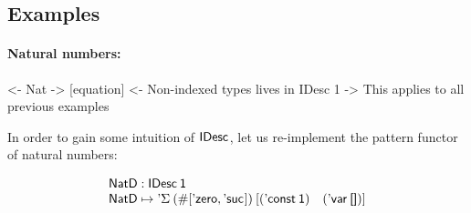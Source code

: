 %
%
%


\subsection{Examples}
\label{sec:idesc-examples}

\paragraph{Natural numbers:}

\begin{wstructure}
<- Nat
    -> [equation]
    <- Non-indexed types lives in IDesc 1
        -> This applies to all previous examples
\end{wstructure}

In order to gain some intuition of $\IDesc{\!}$, let us re-implement
the pattern functor of natural numbers:

\[\stk{
\NatD : \IDesc{\Unit} \\
\NatD \mapsto \DSigma{(\EnumT{[ \NatZero, \NatSuc{\!} ]})}
                     {[ (\DConst{\Unit}) \quad (\DVar{\Void}) ]}
}\]


